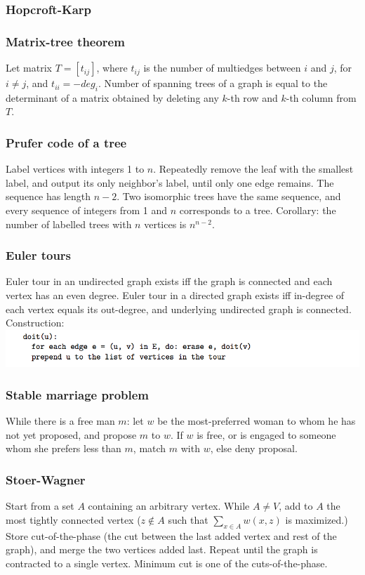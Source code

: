 \documentclass[a4paper,12pt]{article}
\newcommand\includefile[4]{
  \subsubsection{#2}
  \begin{multicols}{2}
    
  \end{multicols}
}
\begin{document}
\includefile{c++}{Hopcroft-Karp}{graph}{bip_match.cpp}

\subsubsection{Matrix-tree theorem}
Let matrix $T = [t_{ij}]$, where $t_{ij}$ is the number of multiedges between $i$ and $j$, for $i \neq j$, and $t_{ii} = -deg_i$.
Number of spanning trees of a graph is equal to the determinant of a matrix obtained by deleting any $k$-th row and $k$-th column from $T$.

\subsubsection{Prufer code of a tree}
Label vertices with integers 1 to $n$. Repeatedly remove the leaf with the smallest label, and output its only neighbor’s label, until only one edge remains. The sequence has length $n - 2$.
Two isomorphic trees have the same sequence, and every sequence of integers from 1 and $n$ corresponds to a tree. Corollary: the number of labelled trees with $n$ vertices is $n^{n-2}$.

\subsubsection{Euler tours}
Euler tour in an undirected graph exists iff the graph is connected and each vertex has an even degree. Euler tour in a directed graph exists iff in-degree of each vertex equals its out-degree, and underlying undirected graph is connected.
Construction:\\
\includegraphics[scale=.7]{graph/euler}

\subsubsection{Stable marriage problem}
While there is a free man $m$: let $w$ be the most-preferred woman to whom he has not yet proposed, and propose $m$ to $w$. If $w$ is free, or is engaged to someone whom she prefers less than $m$, match $m$ with $w$, else deny proposal.

\subsubsection{Stoer-Wagner}
Start from a set $A$ containing an arbitrary vertex. While $A \neq V$, add to $A$ the most tightly connected vertex ($z \not\in A$ such that $\sum_{x\in A}w(x,z)$ is maximized.)
Store cut-of-the-phase (the cut between the last added vertex and rest of the graph), and merge the two vertices added last. Repeat until the graph is contracted to a single vertex. Minimum cut is one of the cuts-of-the-phase.
\begin{multicols}{2}
	
\end{multicols}
\end{document}
